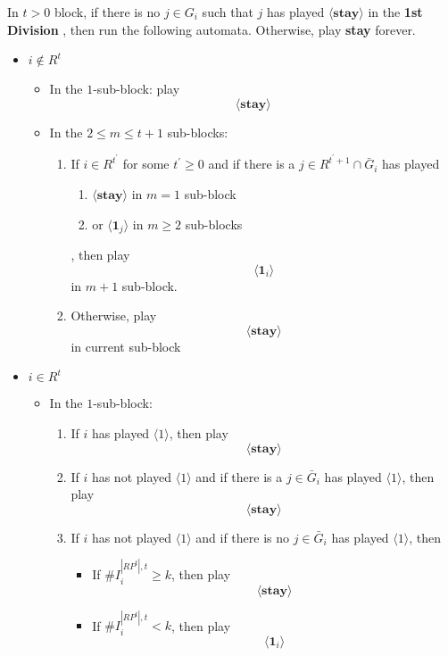 \documentclass[12pt,letter]{article}
\theoremstyle{definition}
\theoremstyle{remark}
\theoremstyle{claim}
\begin{document}
\begin{itemize}
\begin{itemize}
\end{itemize}


In $t>0$ block, if there is no $j\in G_i$ such that $j$ has played $\langle \textbf{stay} \rangle$ in the \textbf{1st Division} , then run the following automata. Otherwise, play \textbf{stay} forever.

\begin{itemize}
\item $i\notin R^t $
\begin{itemize}
\item In the $1$-sub-block: play
\[\langle \textbf{stay} \rangle \]


\item In the $2\leq m\leq t+1$ sub-blocks: 

\begin{enumerate}

\item If $i\in R^{t^{'}}$ for some $t^{'}\geq 0$ and if there is a $j\in R^{t^{'}+1}\cap \bar{G}_i$ has played 
\begin{enumerate}
\item $\langle \textbf{stay} \rangle $ in $m=1$ sub-block
\item or $\langle \mathbf{1}_j \rangle$ in $m\geq 2$ sub-blocks
\end{enumerate}
, then play 
\[\langle \mathbf{1}_i \rangle\] in $m+1$ sub-block.

\item Otherwise, play
\[\langle \textbf{stay} \rangle\] in current sub-block
\end{enumerate}

\end{itemize}

\item $i\in R^t$

\begin{itemize}
\item In the $1$-sub-block:
\begin{enumerate}
\item If $i$ has played $\langle 1 \rangle$, then play
\[\langle \textbf{stay} \rangle \]

\item If $i$ has not played $\langle 1 \rangle$ and if there is a $j\in \bar{G}_i$ has played $\langle 1 \rangle$, then play
\[\langle \textbf{stay} \rangle \]

\item If $i$ has not played $\langle 1 \rangle$ and if there is no $j\in \bar{G}_i$ has played $\langle 1 \rangle$, then
\begin{itemize}
\item If $\# I^{|RP^t|,t}_i\geq k$, then play
\[\langle \textbf{stay} \rangle \]
\item If $\# I^{|RP^t|,t}_i< k$, then play
\[\langle \mathbf{1}_i  \rangle \]
\end{itemize}


\end{enumerate}
\end{itemize}
\end{itemize}
\end{itemize}
\end{document}
